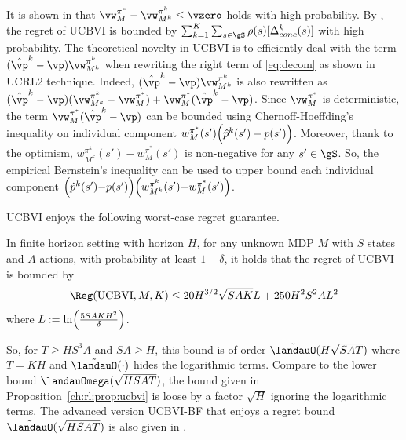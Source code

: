 It is shown in \cite{azar2017minimax} that $\vw^{\pi^*}_M- \vw^{\pi^k}_{M^k}\le \vzero$ holds with high probability.
By , the regret of UCBVI is bounded by ${\sum_{k=1}^K\sum_{s\in\gS}\rho(s)[\Delta_{conc}^k(s)]}$ with high probability.
The theoretical novelty in UCBVI is to efficiently deal with the term $(\hat{\vp}^k-\vp)\vw^{\pi^k}_{M^k}$ when rewriting the right term of \eqref{eq:decom} as shown in UCRL2 technique.
Indeed, $(\hat{\vp}^k-\vp)\vw^{\pi^k}_{M^k}$ is also rewritten as $(\hat{\vp}^k-\vp)(\vw^{\pi^k}_{M^k}-\vw^{\pi^*}_{M}) +\vw^{\pi^*}_{M}(\hat{\vp}^k-\vp)$.
Since $\vw^{\pi^*}_M$ is deterministic, the term $\vw^{\pi^*}_{M}(\hat{\vp}^k-\vp)$ can be bounded using Chernoff-Hoeffding's inequality on individual component $w^{\pi^*}_{M}(s')\Bigl(\hat{p}^k(s')-p(s')\Bigr)$.
Moreover, thank to the optimism, $w^{\pi^k}_{M^k}(s')-w^{\pi^*}_{M}(s')$ is non-negative for any $s'\in\gS$.
So, the empirical Bernstein's inequality can be used to upper bound each individual component $\Bigl(\hat{p}^k(s'){-}p(s')\Bigr)\Bigl(w^{\pi^k}_{M^k}(s'){-}w^{\pi^*}_{M}(s')\Bigr)$.

UCBVI enjoys the following worst-case regret guarantee.
\begin{prop}
    \label{ch:rl:prop:ucbvi}
    In finite horizon setting with horizon $H$, for any unknown MDP $M$ with $S$ states and $A$ actions,
    with probability at least $1-\delta$, it holds that the regret of UCBVI is bounded by
    \begin{align*}
        \Reg(\mathrm{UCBVI}, M, K) \le 20H^{3/2}\sqrt{SAK}L +250H^2S^2AL^2
    \end{align*}
    where $L:=\ln\Bigl(\frac{5SAKH^2}{\delta}\Bigr)$.
\end{prop}
So, for $T\ge HS^3A$ and $SA\ge H$, this bound is of order $\tilde{\landauO}(H\sqrt{SAT})$ where $T=KH$ and $\tilde{\landauO}(\cdot)$ hides the logarithmic terms.
Compare to the lower bound $\landauOmega(\sqrt{HSAT})$, the bound given in Proposition~\ref{ch:rl:prop:ucbvi} is loose by a factor $\sqrt{H}$ ignoring the logarithmic terms.
The advanced version UCBVI-BF that enjoys a regret bound $\tilde{\landauO}(\sqrt{HSAT})$ is also given in \cite{azar2017minimax}.%

